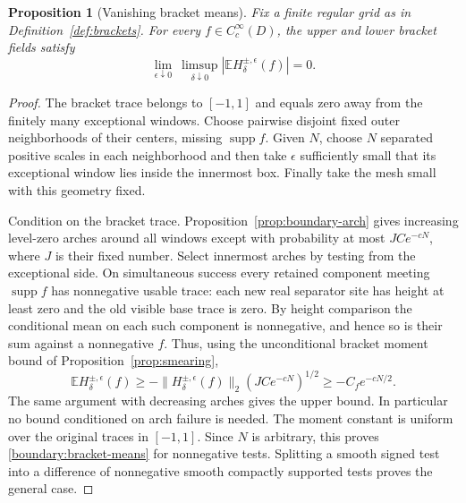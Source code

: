 \documentclass[11pt]{article}
\newtheorem{proposition}[theorem]{Proposition}
\theoremstyle{definition}
\theoremstyle{remark}
\numberwithin{equation}{section}
\begin{document}
\begin{proposition}[Vanishing bracket means]
\label{prop:bracket-collapse}
Fix a finite regular grid as in Definition~\ref{def:brackets}.
For every $f\in C_c^\infty(D)$, the upper and lower bracket fields
satisfy
\begin{equation}
 \lim_{\epsilon\downarrow0}\ \limsup_{\delta\downarrow0}
 \left|\mathbb E H_\delta^{\pm,\epsilon}(f)\right|=0.
 \label{boundary:bracket-means}
\end{equation}
\end{proposition}

\begin{proof}
The bracket trace belongs to $[-1,1]$ and equals zero away from the
finitely many exceptional windows.  Choose pairwise disjoint fixed
outer neighborhoods of their centers, missing $\operatorname{supp} f$.  Given
$N$, choose $N$ separated positive scales in each neighborhood and
then take $\epsilon$ sufficiently small that its exceptional
window lies inside the innermost box.  Finally take the mesh small
with this geometry fixed.

Condition on the bracket trace.  Proposition~\ref{prop:boundary-arch}
gives increasing level-zero arches around all windows except with
probability at most $JC e^{-cN}$, where $J$ is their fixed number.
Select innermost arches by testing from the exceptional side.  On
simultaneous success every retained component meeting $\operatorname{supp} f$
has nonnegative usable trace: each new real separator site has
height at least zero and the old visible base trace is zero.  By
height comparison the conditional mean on each such component is
nonnegative, and hence so is their sum against a nonnegative $f$.
Thus, using the unconditional bracket moment bound
of Proposition~\ref{prop:smearing},
\[
 \mathbb E H_\delta^{\pm,\epsilon}(f)
 \ge -\|H_\delta^{\pm,\epsilon}(f)\|_2
       (JC e^{-cN})^{1/2}
 \ge -C_f e^{-cN/2}.
\]
The same argument with decreasing arches gives the upper bound.
In particular no bound conditioned on arch failure is needed.
The moment constant is uniform over the original traces in
$[-1,1]$.  Since $N$ is arbitrary, this proves
\eqref{boundary:bracket-means} for nonnegative tests.  Splitting a
smooth signed test into a difference of nonnegative smooth compactly
supported tests proves the general case.

\end{proof}
\end{document}
